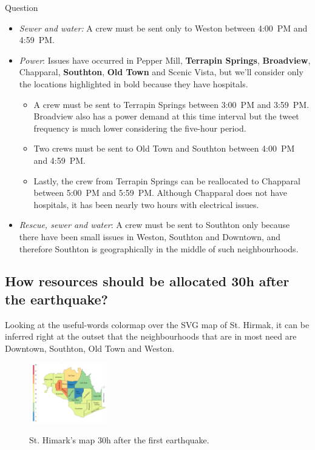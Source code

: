 \begin{section}{Question}
\begin{itemize}
    \item \emph{Sewer and water:} A crew must be sent only to Weston between 
    4:00~PM and 4:59~PM.
    \smallskip 
    \item \emph{Power}: Issues have occurred in Pepper Mill, \textbf{Terrapin
    Springs}, \textbf{Broadview}, Chapparal, \textbf{Southton}, \textbf{Old 
    Town} and Scenic Vista, but we'll consider only the locations 
    highlighted in bold because they have hospitals.
    \begin{itemize}
        \item A crew must be sent to Terrapin Springs between 3:00~PM and
        3:59~PM. Broadview also has a power demand at this time interval but the
        tweet frequency is much lower considering the five-hour period.
        \item Two crews must be sent to Old Town and Southton between 4:00~PM 
        and 4:59~PM.
        \item Lastly, the crew from Terrapin Springs can be reallocated to
        Chapparal between 5:00~PM and 5:59~PM. Although Chapparal does not have
        hospitals, it has been nearly two hours with electrical issues.
    \end{itemize}
    \item \emph{Rescue, sewer and water}: A crew must be sent to Southton only
    because there have been small issues in Weston, Southton and Downtown, and
    therefore Southton is geographically in the middle of such neighbourhoods.
\end{itemize}


\subsection{How resources should be allocated 30h after the earthquake?}
Looking at the useful-words colormap over the SVG map of St. Hirmak, it can be
inferred right at the outset that the neighbourhoods that are in most need are
Downtown, Southton, Old Town and Weston.

\begin{figure}[!h]
    \centering
    \includegraphics[width=0.30\textwidth]{figs/cond_30h/cond_30h_svg.png}
    \label{fig:map_30h}
    \caption{St. Himark's map 30h after the first earthquake.}
\end{figure}


\end{section}
